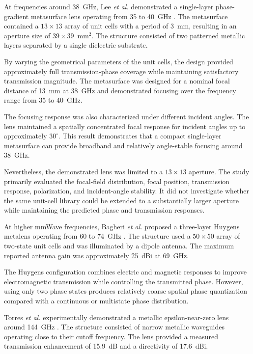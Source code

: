 At frequencies around 38~GHz, Lee \textit{et al.} demonstrated a
single-layer phase-gradient metasurface lens operating from 35 to
40~GHz \cite{Lee2021}. The metasurface contained a
$13\times13$ array of unit cells with a period of 3~mm, resulting in
an aperture size of $39\times39$~mm$^2$. The structure consisted of
two patterned metallic layers separated by a single dielectric
substrate.

By varying the geometrical parameters of the unit cells, the design
provided approximately full transmission-phase coverage while
maintaining satisfactory transmission magnitude. The metasurface was
designed for a nominal focal distance of 13~mm at 38~GHz and
demonstrated focusing over the frequency range from 35 to 40~GHz.

The focusing response was also characterized under different incident
angles. The lens maintained a spatially concentrated focal response
for incident angles up to approximately $30^{\circ}$. This result
demonstrates that a compact single-layer metasurface can provide
broadband and relatively angle-stable focusing around 38~GHz.

Nevertheless, the demonstrated lens was limited to a
$13\times13$ aperture. The study primarily evaluated the focal-field
distribution, focal position, transmission response, polarization,
and incident-angle stability. It did not investigate whether the same
unit-cell library could be extended to a substantially larger
aperture while maintaining the predicted phase and transmission
responses.

At higher mmWave frequencies, Bagheri \textit{et al.} proposed a
three-layer Huygens metalens operating from 60 to 74~GHz
\cite{Bagheri2023}. The structure used a $50\times50$ array of
two-state unit cells and was illuminated by a dipole antenna. The
maximum reported antenna gain was approximately 25~dBi at 69~GHz.

The Huygens configuration combines electric and magnetic responses to
improve electromagnetic transmission while controlling the
transmitted phase. However, using only two phase states produces
relatively coarse spatial phase quantization compared with a
continuous or multistate phase distribution.

Torres \textit{et al.} experimentally demonstrated a metallic
epsilon-near-zero lens around 144~GHz
\cite{Torres2015}. The structure consisted of narrow metallic
waveguides operating close to their cutoff frequency. The lens
provided a measured transmission enhancement of 15.9~dB and a
directivity of 17.6~dBi.

